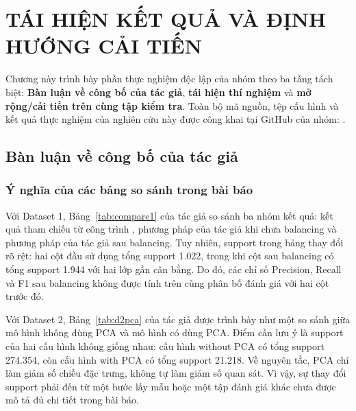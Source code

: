 \chapter{TÁI HIỆN KẾT QUẢ VÀ ĐỊNH HƯỚNG CẢI TIẾN}

Chương này trình bày phần thực nghiệm độc lập của nhóm theo ba tầng tách biệt: \textbf{Bàn luận về công bố của tác giả}, \textbf{tái hiện thí nghiệm} và \textbf{mở rộng/cải tiến trên cùng tập kiểm tra}. Toàn bộ mã nguồn, tệp cấu hình và kết quả thực nghiệm của nghiên cứu
này được công khai tại GitHub của nhóm:
.

\section{Bàn luận về công bố của tác giả}

\subsection{Ý nghĩa của các bảng so sánh trong bài báo}

Với Dataset 1, Bảng~\ref{tab:compare1} của tác giả so sánh ba nhóm kết quả: kết quả tham chiếu từ công trình , phương pháp của tác giả khi chưa balancing và phương pháp của tác giả sau balancing. Tuy nhiên, support trong bảng thay đổi rõ rệt: hai cột đầu sử dụng tổng support 1.022, trong khi cột sau balancing có tổng support 1.944 với hai lớp gần cân bằng. Do đó, các chỉ số Precision, Recall và F1 sau balancing không được tính trên cùng phân bố đánh giá với hai cột trước đó.

Với Dataset 2, Bảng~\ref{tab:d2pca} của tác giả được trình bày như một so sánh giữa mô hình không dùng PCA và mô hình có dùng PCA. Điểm cần lưu ý là support của hai cấu hình không giống nhau: cấu hình without PCA có tổng support 274.354, còn cấu hình with PCA có tổng support 21.218. Về nguyên tắc, PCA chỉ làm giảm số chiều đặc trưng, không tự làm giảm số quan sát. Vì vậy, sự thay đổi support phải đến từ một bước lấy mẫu hoặc một tập đánh giá khác chưa được mô tả đủ chi tiết trong bài báo.

